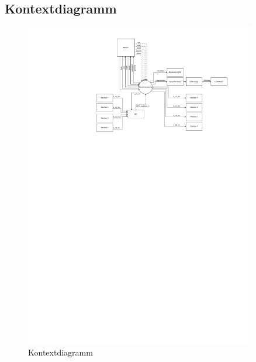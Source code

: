 \subsection{Kontextdiagramm}
\begin{figure}[h]
    \centering
    \includegraphics[page=1,width=0.9\textwidth]{pdfs/Kontextdiagramm.pdf} 
    \caption{Kontextdiagramm}
    \label{fig:Kontextdiagramm}
\end{figure}

